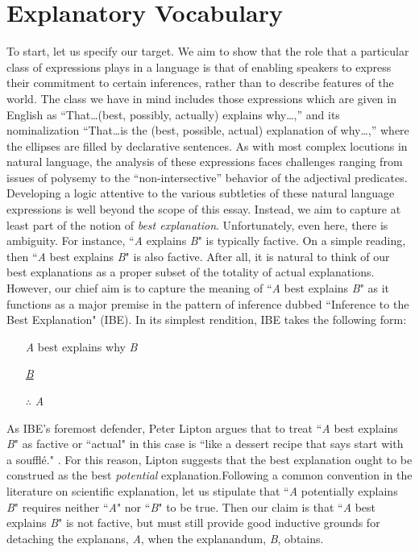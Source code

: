 \documentclass{article}
\newcounter{fncntr}
\newcommand{\fnmark}[1]{\refstepcounter{fncntr}\label{#1}\footnotemark[\getrefnumber{#1}]}
\newcommand{\fntext}[2]{\footnotetext[\getrefnumber{#1}]{#2}}
\theoremstyle{definition}
\theoremstyle{definition}
\theoremstyle{definition}
\theoremstyle{definition}
\theoremstyle{remark}
\theoremstyle{definition}
\theoremstyle{definition}
\begin{document}
%
%
%


\section{Explanatory Vocabulary}

To start, let us specify our target. We aim to show that the role that a particular class of expressions plays in a language is that of enabling speakers to express their commitment to certain inferences, rather than to describe features of the world. The class we have in mind includes those expressions which are given in English as ``That\ldots (best, possibly, actually) explains why\ldots,'' and its nominalization ``That\ldots is the (best, possible, actual) explanation of why\ldots,'' where the ellipses are filled by declarative sentences. As with most complex locutions in natural language, the analysis of these expressions faces challenges ranging from issues of polysemy to the ``non-intersective'' behavior of the adjectival predicates. Developing a logic attentive to the various subtleties of these natural language expressions is well beyond the scope of this essay. Instead, we aim to capture at least part of the notion of \textit{best explanation}. Unfortunately, even here, there is ambiguity. For instance, ``\textit{A} explains \textit{B}" is typically factive. On a simple reading, then ``\textit{A} best explains \textit{B}" is also factive. After all, it is natural to think of our best explanations as a proper subset of the totality of actual explanations. However, our chief aim is to capture the meaning of ``\textit{A} best explains \textit{B}"  as it functions as a major premise in the pattern of inference dubbed ``Inference to the Best Explanation" (IBE). In its simplest rendition, IBE takes the following form:

\begin{itemize}[itemsep=.01mm]\centering
	\item[]\textit{A} best explains why \textit{B}
	\item[]\underline{\textit{B}\hspace{2.9cm}}
	\item[$\therefore $]\textit{A}$ \quad\quad\quad\quad\quad\quad $
\end{itemize}

As IBE's foremost defender, Peter Lipton argues that to treat  ``\textit{A} best explains \textit{B}" as factive or ``actual" in this case is ``like a dessert recipe that says start with a souffl\'e." \parencite[58]{Lipton2004}. For this reason, Lipton suggests that the best explanation ought to be construed as the best \textit{potential} explanation.\fnmark{Lovely} Following a common convention in the literature on scientific explanation, let us stipulate that ``\textit{A} potentially explains \textit{B}" requires neither ``\textit{A}" nor ``\textit{B}" to be true. Then our claim is that ``\textit{A} best explains \textit{B}" is not factive, but must still provide good inductive grounds for detaching the explanans, \textit{A}, when the explanandum, \textit{B}, obtains.
\end{document}
